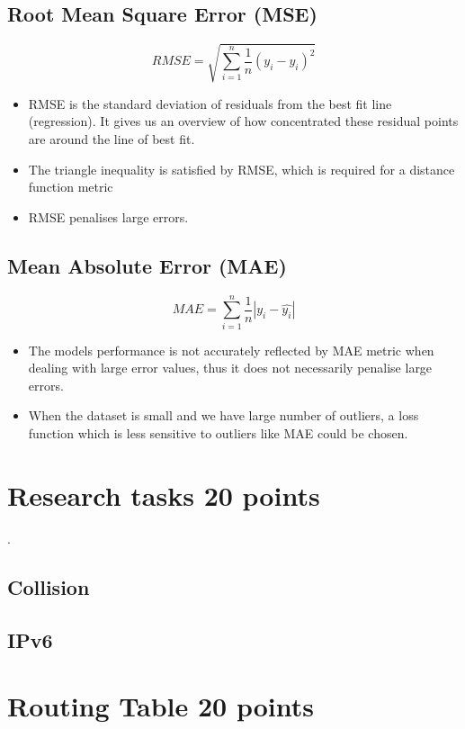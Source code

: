 \documentclass{resources/WeSTassignment}
\begin{document}
\subsection{ Root Mean Square Error (MSE)}
\[ RMSE =\sqrt{ \sum_{i=1}^{n}\frac{1}{n} (y_i-\hat{y_i} )^2} \]
\begin{itemize}
\item RMSE is the standard deviation of residuals from the best fit line (regression). It gives us an overview of how concentrated these residual points are around the line of best fit.
\item The triangle inequality is satisfied by RMSE, which is required for a distance function metric
\item RMSE penalises large errors.
\end{itemize}
\subsection{Mean Absolute Error (MAE)}  
\[ MAE = \sum_{i=1}^{n}\frac{1}{n} |y_i-\hat{y_i}| \]
\begin{itemize}
\item The models performance is not accurately reflected by MAE metric when dealing with large error values, thus it does not necessarily penalise large errors.
\item When the dataset is small and we have large number of outliers, a loss function which is  less sensitive to outliers like MAE could be chosen.
\end{itemize}
\section{Research tasks \hfill {20 points}}
.
\subsection{Collision}


\subsection{IPv6}


\section{Routing Table \hfill {20 points}}
\end{document}
